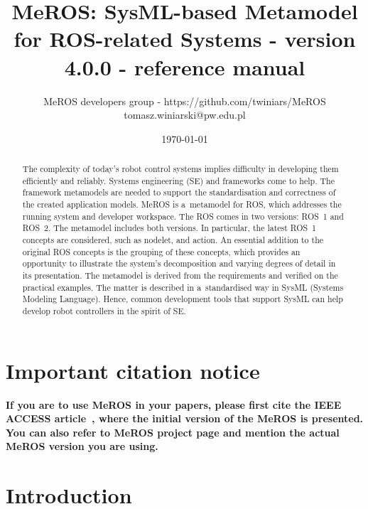 \documentclass[11pt,oneside,a4paper]{report}
\begin{document}
	
	\title{MeROS: SysML-based Metamodel for ROS-related Systems - version 4.0.0 - reference manual}
\author{MeROS developers group - https://github.com/twiniars/MeROS \\ tomasz.winiarski@pw.edu.pl}
\date{\today}
\maketitle


	\begin{abstract}
		The complexity of today's robot control systems implies difficulty in developing them efficiently and reliably. Systems engineering (SE) and frameworks come to help. The framework metamodels are needed to support the standardisation and correctness of the created application models. MeROS is a~metamodel for ROS, which addresses the running system and developer workspace. The ROS comes in two versions: ROS~1 and ROS~2. The metamodel includes both versions. In particular, the latest ROS~1 concepts are considered, such as nodelet, and action. An essential addition to the original ROS concepts is the grouping of these concepts, which provides an opportunity to illustrate the system's decomposition and varying degrees of detail in its presentation. The metamodel is derived from the requirements and verified on the practical examples. The matter is described in a~standardised way in SysML (Systems Modeling Language). Hence, common development tools that support SysML can help develop robot controllers in the spirit of SE.
	\end{abstract}
	
	
	
	\maketitle
	
\chapter*{Important citation notice}

\textbf{If you are to use MeROS in your papers, please first cite the IEEE ACCESS  article~\cite{meros-access}, where the initial version of the MeROS is presented. You can also refer to MeROS project page \cite{meros-www} and mention the actual MeROS version you are using.}
	
	
\chapter{Introduction}
\label{ch:intro}	
\end{document}
